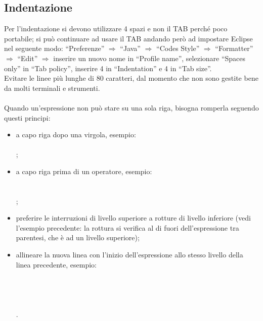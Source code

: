 \subsection{Indentazione}
Per l'indentazione si devono utilizzare 4 spazi e non il TAB perch\'e
poco portabile; si pu\`o continuare ad usare il TAB andando per\`o ad
impostare Eclipse nel seguente modo: ``Preferenze'' $\Rightarrow$ ``Java''
$\Rightarrow$ ``Codes Style'' $\Rightarrow$ ``Formatter''$\Rightarrow$ ``Edit''
$\Rightarrow$ inserire un nuovo nome in ``Profile name'', selezionare
``Spaces only'' in ``Tab policy'', inserire 4 in ``Indentation'' e 4 in ``Tab
size''. \\ Evitare le linee pi\`u lunghe di 80 caratteri, dal momento che non sono gestite bene da molti terminali e strumenti.\\ \\
Quando un'espressione non pu\`o stare su una sola riga, bisogna
romperla seguendo questi principi:
\begin{itemize}
  \item a capo riga dopo una virgola, esempio: \\
  \hspace*{0.5cm}  \\ ;
  \item a capo riga prima di un operatore, esempio: \\
  \hspace*{0.5cm}  \\
  \hspace*{2.5cm}  \\ ;
  \item preferire le interruzioni di livello superiore a rotture di livello
  inferiore (vedi l'esempio precedente: la rottura si verifica al
  di fuori dell'espressione tra parentesi, che \`e ad un livello superiore);
  \item allineare la nuova linea con l'inizio dell'espressione allo stesso
  livello della linea precedente, esempio: \\
  \hspace*{0.5cm}  \\
  \hspace*{2.5cm}  \\
  \hspace*{1.5cm}  \\
  \hspace*{0.5cm} \co{\}} \\.
\end{itemize}

